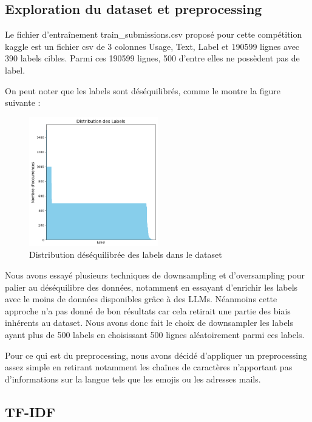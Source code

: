 \subsection{Exploration du dataset et preprocessing}

Le fichier d'entraînement train\_submissions.csv proposé pour cette compétition kaggle est un fichier csv de 3 colonnes Usage, Text, Label et 190599 lignes avec 390 labels cibles. Parmi ces 190599 lignes, 500 d'entre elles ne possèdent pas de label. 

On peut noter que les labels sont déséquilibrés, comme le montre la figure suivante :

\begin{figure}[h!]
    \centering
    \includegraphics[width=0.5\textwidth]{img/unbalance.png}
    \caption{Distribution déséquilibrée des labels dans le dataset}
    \label{fig:unbalance}
\end{figure}

Nous avons essayé plusieurs techniques de downsampling et d'oversampling pour palier au déséquilibre des données, notamment en essayant d'enrichir les labels avec le moins de données disponibles grâce à des LLMs. Néanmoins cette approche n'a pas donné de bon résultats car cela retirait une partie des biais inhérents au dataset. Nous avons donc fait le choix de downsampler les labels ayant plus de 500 labels en choisissant 500 lignes aléatoirement parmi ces labels.

Pour ce qui est du preprocessing, nous avons décidé d'appliquer un preprocessing assez simple en retirant notamment les chaînes de caractères n'apportant pas d'informations sur la langue tels que les emojis ou les adresses mails.

\subsection{TF-IDF}

